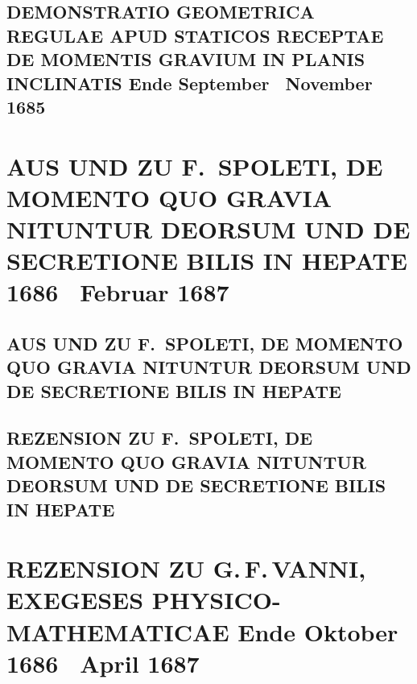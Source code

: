 \documentclass[%
fontsize=10pt,
]{scrbook}
\DeclareRobustCommand{\bracks}[1]{%
\textup{\lbrack}#1\textup{\rbrack}}
\begin{document}
\section[tocentry={Demonstratio geometrica regulae apud Staticos receptae de momentis gravium in planis inclinatis
\enskip \bracks{Ende September \textendash\ November 1685}%
},
head={Demonstratio geometrica regulae apud Staticos receptae}]%
{\MakeUppercase{Demonstratio geometrica regulae apud Staticos receptae de momentis gravium in planis inclinatis} 
\newline \bracks{Ende September \textendash\ November 1685}%
}
\label{49409}






\chapter[tocentry={Aus und zu F.~Spoleti, De momento quo gravia nituntur deorsum und De secretione bilis in hepate
\enskip \bracks{1686 \textendash\ Februar 1687}},
head={Aus und zu Spoleti, De momento und De secretione}]
{\MakeUppercase{Aus und zu F.~Spoleti, De momento quo gravia nituntur deorsum und De secretione bilis in hepate}
\newline \bracks{1686 \textendash\ Februar 1687}}
\label{intro_spoleti}

\section[tocentry={Aus und zu F.~Spoleti, De momento quo gravia nituntur deorsum und De secretione bilis in hepate
},
head={Aus und zu Spoleti, De momento und De secretione}]
{\MakeUppercase{Aus und zu F.~Spoleti, De momento quo gravia nituntur deorsum und De secretione bilis in hepate}
}
\label{60458}

\section[tocentry={Rezension zu F.~Spoleti, De momento quo gravia nituntur deorsum und De secretione bilis in hepate
},
head={Rezension zu Spoleti, De momento und De secretione bilis}]
{\MakeUppercase{Rezension zu F.~Spoleti, De momento quo gravia nituntur deorsum und De secretione bilis in hepate}
}
\label{41200}


\chapter[tocentry={Rezension zu G.\,F.\,Vanni, Exegeses physico-mathematicae
\enskip \bracks{Ende Oktober 1686 \textendash\ April 1687}%
},
head={Rezension zu Vanni, Exegeses physico-mathematicae}]%
{\MakeUppercase{Rezension zu G.\,F.\,Vanni, Exegeses physico-mathematicae}
\newline \bracks{Ende Oktober 1686 \textendash\ April 1687}%
}
\end{document}
